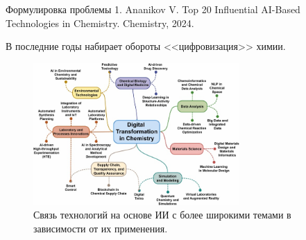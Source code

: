 \documentclass{beamer}
\begin{document}
	\begin{frame}{Формулировка проблемы}
		{\scriptsize1. Ananikov V. Top 20 Influential AI-Based Technologies in Chemistry. Chemistry, 2024.}
		
		В последние годы набирает обороты <<цифровизация>> химии.
		\begin{figure}
			\centering
			\includegraphics[width=0.7\textwidth]{images/digital_transformation_in_chemistry.jpg}
			\caption[pt9]{Связь технологий на основе ИИ с более широкими темами в зависимости от их применения.}
			\label{fig: digital_transformation_in_chemistry}
		\end{figure} 
	\end{frame}
	
\end{document}

